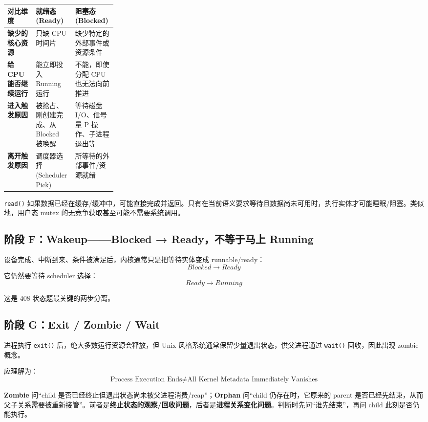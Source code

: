 \documentclass[11pt,a4paper]{ctexart}
\newcommand{\kw}[1]{\textbf{#1}}
\newcommand{\code}[1]{\texttt{#1}}
\begin{document}
\begingroup
\small
\renewcommand{\arraystretch}{1.25}
\setlength{\tabcolsep}{6pt}
\begin{tabularx}{\linewidth}{>{\bfseries}p{0.26\linewidth} X X}
\toprule
对比维度 & 就绪态 (Ready) & 阻塞态 (Blocked)\\
\midrule
缺少的核心资源 & 只缺 CPU 时间片 & 缺少特定的外部事件或资源条件\\
给 CPU 能否继续运行 & 能立即投入 Running 运行 & 不能，即使分配 CPU 也无法向前推进\\
进入触发原因 & 被抢占、刚创建完成、从 Blocked 被唤醒 & 等待磁盘 I/O、信号量 P 操作、子进程退出等\\
离开触发原因 & 调度器选择 (Scheduler Pick) & 所等待的外部事件/资源就绪\\
\bottomrule
\end{tabularx}
\endgroup

\begin{warn}
\code{read()} 如果数据已经在缓存/缓冲中，可能直接完成并返回。只有在当前语义要求等待且数据尚未可用时，执行实体才可能睡眠/阻塞。类似地，用户态 mutex 的无竞争获取甚至可能不需要系统调用。
\end{warn}

\subsection{阶段 F：Wakeup——Blocked → Ready，不等于马上 Running}

设备完成、中断到来、条件被满足后，内核通常只是把等待实体变成 runnable/ready：
\[
\boxed{Blocked\rightarrow Ready}
\]
它仍然要等待 scheduler 选择：
\[
\boxed{Ready\rightarrow Running}
\]

这是 408 状态题最关键的两步分离。

\subsection{阶段 G：Exit / Zombie / Wait}

进程执行 \code{exit()} 后，绝大多数运行资源会释放，但 Unix 风格系统通常保留少量退出状态，供父进程通过 \code{wait()} 回收，因此出现 zombie 概念。

应理解为：
\[
\text{Process Execution Ends}\neq\text{All Kernel Metadata Immediately Vanishes}
\]

\begin{exam}
\kw{Zombie} 问“child 是否已经终止但退出状态尚未被父进程消费/reap”；\kw{Orphan} 问“child 仍存在时，它原来的 parent 是否已经先结束，从而父子关系需要被重新接管”。前者是\kw{终止状态的观察/回收问题}，后者是\kw{进程关系变化问题}。判断时先问“谁先结束”，再问 child 此刻是否仍能执行。
\end{exam}
\end{document}
